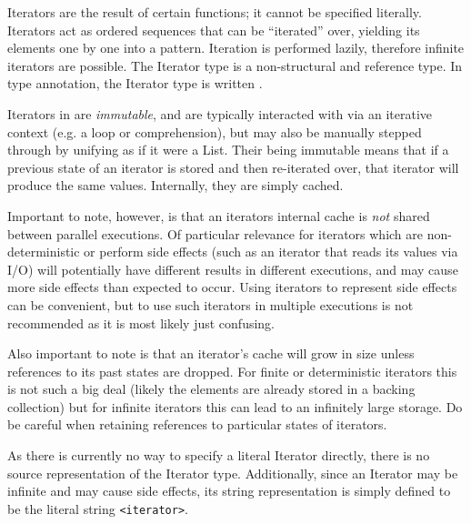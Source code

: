 Iterators are the result of certain functions; it cannot be specified literally.
Iterators act as ordered sequences that can be ``iterated'' over, yielding its
elements one by one into a pattern. Iteration is performed lazily, therefore
infinite iterators are possible. The Iterator type is a non-structural and
reference type. In type annotation, the Iterator type is written .

Iterators in \Trilogy{} are \emph{immutable}, and are typically interacted
with via an iterative context (e.g. a  loop or comprehension), but
may also be manually stepped through by unifying as if it were a List. Their
being immutable means that if a previous state of an iterator is stored and then
re-iterated over, that iterator will produce the same values. Internally, they
are simply cached.

Important to note, however, is that an iterators internal cache is \emph{not}
shared between parallel executions. Of particular relevance for iterators which
are non-deterministic or perform side effects (such as an iterator that reads
its values via I/O) will potentially have different results in different executions,
and may cause more side effects than expected to occur. Using iterators to
represent side effects can be convenient, but to use such iterators in multiple
executions is not recommended as it is most likely just confusing.

Also important to note is that an iterator's cache will grow in size unless
references to its past states are dropped. For finite or deterministic iterators
this is not such a big deal (likely the elements are already stored in a backing
collection) but for infinite iterators this can lead to an infinitely large
storage. Do be careful when retaining references to particular states of iterators.

As there is currently no way to specify a literal Iterator directly, there is no
source representation of the Iterator type. Additionally, since an Iterator
may be infinite and may cause side effects, its string representation is simply
defined to be the literal string \texttt{<iterator>}.

